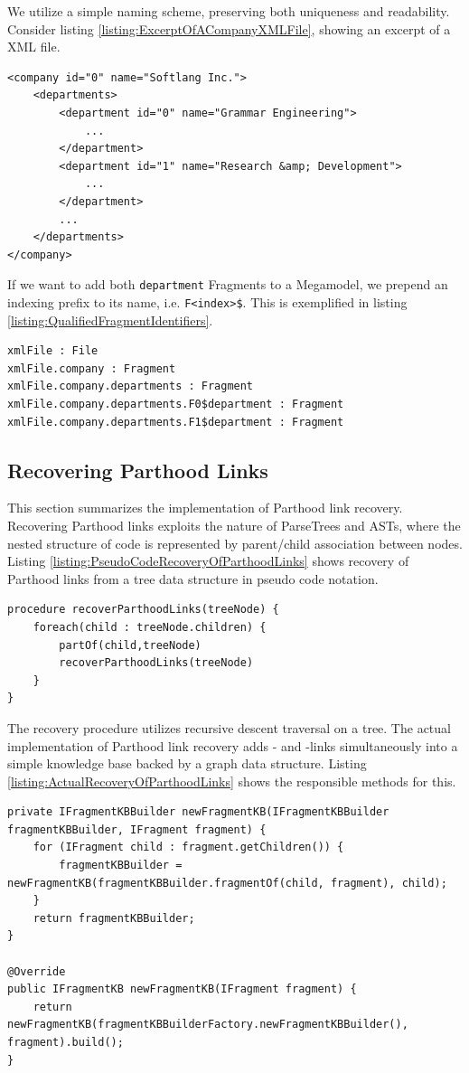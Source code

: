 We utilize a simple naming scheme, preserving both uniqueness and readability.
Consider listing \ref{listing:ExcerptOfACompanyXMLFile}, showing an excerpt of a \gls{XML} file.
\begin{lstlisting}[caption={Excerpt of a Company XML file},label={listing:ExcerptOfACompanyXMLFile}]
<company id="0" name="Softlang Inc.">
    <departments>
        <department id="0" name="Grammar Engineering">
			...
        </department>
        <department id="1" name="Research &amp; Development">
            ...
        </department>
        ...
    </departments>
</company>
\end{lstlisting}
If we want to add both \texttt{department} \glspl{Fragment} to a \gls{Megamodel}, we prepend an indexing prefix to its name, i.e. \texttt{F<index>\$}.
This is exemplified in listing \ref{listing:QualifiedFragmentIdentifiers}.
\begin{lstlisting}[caption={Qualified Fragment Identifiers},label={listing:QualifiedFragmentIdentifiers}]
xmlFile : File
xmlFile.company : Fragment
xmlFile.company.departments : Fragment
xmlFile.company.departments.F0$department : Fragment
xmlFile.company.departments.F1$department : Fragment
\end{lstlisting}


\subsection{Recovering Parthood Links}
\label{subsection:RecoveringParthoodLinks}
This section summarizes the implementation of \gls{Parthood} link recovery.
Recovering \gls{Parthood} links exploits the nature of \glspl{ParseTree} and \glspl{AST}, where the nested structure of code is represented by parent/child association between nodes.
Listing \ref{listing:PseudoCodeRecoveryOfParthoodLinks} shows recovery of \gls{Parthood} links from a tree data structure in pseudo code notation.
\begin{lstlisting}[caption={Pseudo code Recovery of Parthood Links},label={listing:PseudoCodeRecoveryOfParthoodLinks}]
procedure recoverParthoodLinks(treeNode) {
	foreach(child : treeNode.children) {
		partOf(child,treeNode)
		recoverParthoodLinks(treeNode)	
	}
}
\end{lstlisting}
The recovery procedure utilizes recursive descent traversal on a tree.
The actual implementation of \gls{Parthood} link recovery adds \partOf- and \fragmentOf-links simultaneously into a simple knowledge base backed by a graph data structure.
Listing \ref{listing:ActualRecoveryOfParthoodLinks} shows the responsible methods for this.
\begin{lstlisting}[caption={Actual Recovery of Parthood Links},label={listing:ActualRecoveryOfParthoodLinks}]
private IFragmentKBBuilder newFragmentKB(IFragmentKBBuilder fragmentKBBuilder, IFragment fragment) {
    for (IFragment child : fragment.getChildren()) {
        fragmentKBBuilder = newFragmentKB(fragmentKBBuilder.fragmentOf(child, fragment), child);
    }
    return fragmentKBBuilder;
}

@Override
public IFragmentKB newFragmentKB(IFragment fragment) {
	return newFragmentKB(fragmentKBBuilderFactory.newFragmentKBBuilder(), fragment).build();
}
\end{lstlisting}


